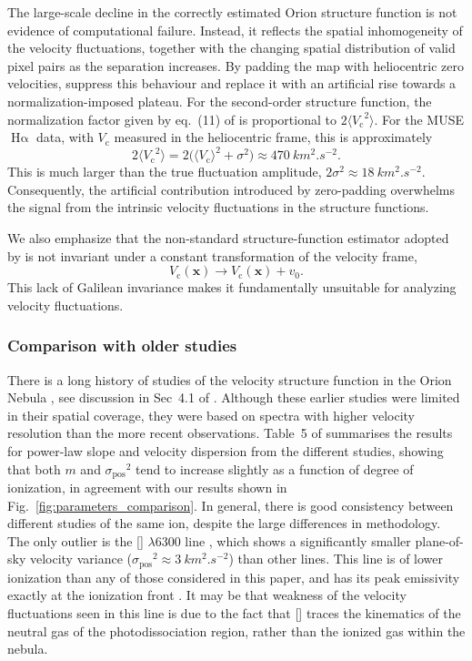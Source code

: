 \documentclass[fleqn,usenatbib, useAMS, a4paper]{mnras}
\newcommand\pos{\ensuremath{_{\mathrm{pos}}}}
\newcommand\ha{\ensuremath{\text{H}\upalpha}}
\newcommand\Wav[1]{\ensuremath{\lambda #1}}
\newcommand\halpha{\ha}
\newcommand\oi{[\ion{O}{I}] \Wav{6300}}
\newcommand\vcentroid{\ensuremath{V_{\text{c}}}}
\begin{document}
The large-scale decline in the correctly estimated Orion structure function
is not evidence of computational failure.
Instead, it reflects the spatial inhomogeneity of the velocity fluctuations,
together with the changing spatial distribution of valid pixel pairs as the
separation increases.
By padding the map with heliocentric zero velocities,
\citeauthor{2019MNRAS.483..704A} suppress this behaviour and replace it with
an artificial rise towards a normalization-imposed plateau.
For the second-order structure function, the normalization factor given by
eq.~(11) of \citet{Anorve-Zeferino:2023a} is proportional to
\(2\langle \vcentroid^2 \rangle\).
For the MUSE \halpha{} data, with \(\vcentroid\) measured in the heliocentric frame,
this is approximately
\[
2\langle \vcentroid^2 \rangle
=
2\big(
\langle \vcentroid \rangle^2 + \sigma^2
\big)
\approx
\qty{470}{km^2.s^{-2}}.
\]
This is much larger than the true fluctuation amplitude,
\(2\sigma^2 \approx \qty{18}{km^2.s^{-2}}\).
Consequently, the artificial contribution introduced by zero-padding overwhelms
the signal from the intrinsic velocity fluctuations in the
\citeauthor{Anorve-Zeferino:2023a} structure functions.

We also emphasize that the non-standard structure-function estimator
adopted by \citeauthor{Anorve-Zeferino:2023a} is not invariant under
a constant transformation of the velocity frame,
\[
\vcentroid(\boldsymbol{x})
\rightarrow
\vcentroid(\boldsymbol{x})+v_0.
\]
This lack of Galilean invariance makes it fundamentally unsuitable
for analyzing velocity fluctuations.

\subsubsection{Comparison with older studies}
\label{sec:comp-with-older}

There is a long history of studies of the velocity structure function in the Orion Nebula
\citep[e.g.,][]{castaneda1988, 1992ApJ...387..229O, Wen:1993a},
see discussion in Sec~4.1 of \citet{arthur2016turbulence}.
Although these earlier studies were limited in their spatial coverage,
they were based on spectra with higher velocity resolution than the more recent observations.
Table~5 of \citet{arthur2016turbulence} summarises the results for power-law slope and velocity dispersion
from the different studies, showing that both \(m\) and \(\sigma\pos^2\) tend to increase slightly
as a function of degree of ionization, in agreement with our results shown in Fig.~\ref{fig:parameters_comparison}.
In general, there is good consistency between different studies of the same ion,
despite the large differences in methodology.
The only outlier is the \oi{} line \citep{1992ApJ...387..229O},
which shows a significantly smaller plane-of-sky velocity variance (\(\sigma\pos^2 \approx \qty{3}{km^2.s^{-2}}\))
than other lines.
This line is of lower ionization than any of those considered in this paper,
and has its peak emissivity exactly at the ionization front \citep[Fig.~5c]{2021MNRAS.502.4597H}.
It may be that weakness of the velocity fluctuations seen in this line
is due to the fact that [] traces the kinematics of the neutral gas of the
photodissociation region, rather than the ionized gas within the nebula.
\end{document}
